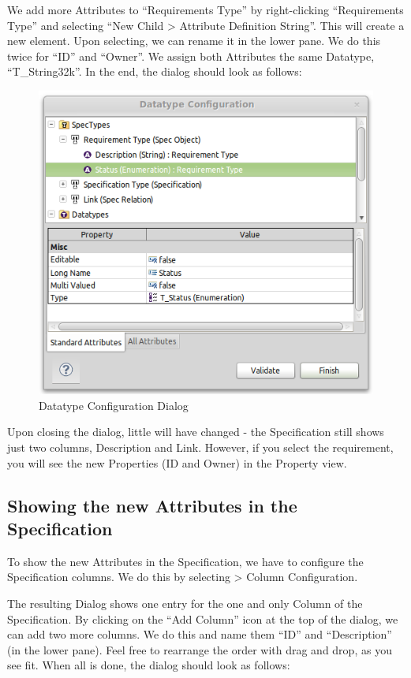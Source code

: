 We add more Attributes to ``Requirements Type'' by right-clicking
``Requirements Type'' and selecting ``New Child \textgreater{} Attribute
Definition String''. This will create a new element. Upon selecting, we
can rename it in the lower pane. We do this twice for ``ID'' and
``Owner''. We assign both Attributes the same Datatype,
``T\_String32k''. In the end, the dialog should look as follows:

\begin{figure}[h!]
\centering
\includegraphics[width=0.8\linewidth]{../rmf-images/pror_datatype_configuration.png}
\caption{Datatype Configuration Dialog}
\label{fig:datatype_configuration}
\end{figure}

Upon closing the dialog, little will have changed - the Specification
still shows just two columns, Description and Link. However, if you
select the requirement, you will see the new Properties (ID and Owner)
in the Property view.

\subsection{Showing the new Attributes in the Specification}

To show the new Attributes in the Specification, we have to configure
the Specification columns. We do this by selecting \pror{} \textgreater{}
Column Configuration.

The resulting Dialog shows one entry for the one and only Column of the
Specification. By clicking on the ``Add Column'' icon at the top of the
dialog, we can add two more columns. We do this and name them ``ID'' and
``Description'' (in the lower pane). Feel free to rearrange the order
with drag and drop, as you see fit. When all is done, the dialog should
look as follows:

